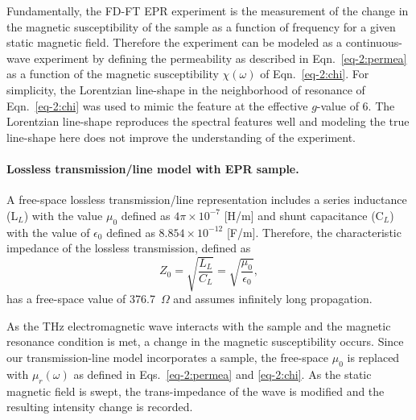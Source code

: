 Fundamentally, the FD-FT EPR experiment is the measurement of the change in the magnetic susceptibility of the sample as a function of frequency for a given static magnetic field. Therefore the experiment can be modeled as a continuous-wave experiment by defining the permeability as described in Eqn.~\ref{eq-2:permea} as a function of the magnetic susceptibility $\chi(\omega)$ of Eqn.~\ref{eq-2:chi}. For simplicity, the Lorentzian line-shape in the neighborhood of resonance of Eqn.~\ref{eq-2:chi} was used to mimic the feature at the effective $g$-value of 6. The Lorentzian line-shape reproduces the spectral features well and modeling the true line-shape here does not improve the understanding of the experiment. 

\noindent \paragraph*{Lossless transmission\-/line model with EPR sample.} A free-space lossless transmission\-/line representation includes a series inductance (L$_L$) with the value $\mu_0$ defined as $4 \pi \times 10^{-7}$ [H/m] and shunt capacitance (C$_L$) with the value of $\epsilon_0$ defined as $8.854 \times 10^{-12}$ [F/m]. \cite{ramo1984fields} Therefore, the characteristic impedance of the lossless transmission, defined as
\begin{equation}
    Z_0 = \sqrt{\frac{L_L}{C_L}} = \sqrt{\frac{\mu_0}{\epsilon_0}},
\end{equation}
has a free-space value of 376.7~$\Omega$ and assumes infinitely long propagation. 

As the THz electromagnetic wave interacts with the sample and the magnetic resonance condition is met, a change in the magnetic susceptibility occurs. Since our transmission-line model incorporates a sample, the free-space $\mu_0$ is replaced with $\mu_r(\omega)$ as defined in Eqs.~\ref{eq-2:permea} and \ref{eq-2:chi}. As the static magnetic field is swept, the trans-impedance of the wave is modified and the resulting intensity change is recorded.

